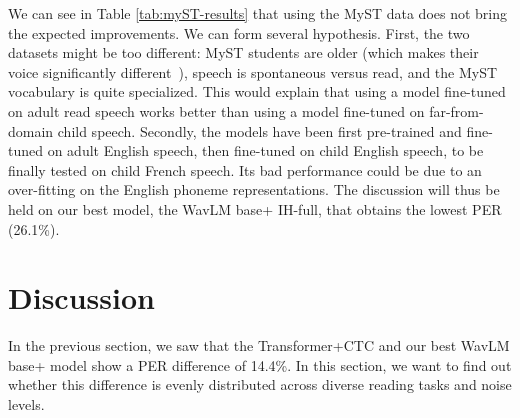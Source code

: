 \documentclass{Interspeech2024}
\begin{document}
We can see in Table \ref{tab:myST-results} that using the MyST data does not bring the expected improvements. We can form several hypothesis. First, the two datasets might be too different: MyST students are older (which makes their voice significantly different~\cite{Yeung18-OTD}), speech is spontaneous versus read, and the MyST vocabulary is quite specialized. This would explain that using a model fine-tuned on adult read speech works better than using a model fine-tuned on far-from-domain child speech. Secondly, the models have been first pre-trained and fine-tuned on adult English speech, then fine-tuned on child English speech, to be finally tested on child French speech. Its bad performance could be due to an over-fitting on the English phoneme representations.
The discussion will thus be held on our best model, the WavLM base+ IH-full, that obtains the lowest PER (26.1\%).

\vspace{-0.2cm}
\section{Discussion}

In the previous section, we saw that the Transformer+CTC and our best WavLM base+ model show a PER difference of 14.4\%. In this section, we want to find out whether this difference is evenly distributed across diverse reading tasks and noise levels.

\end{document}
